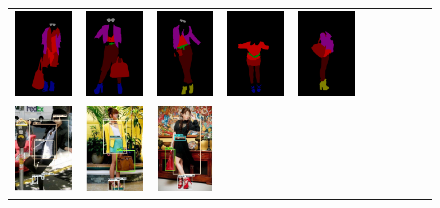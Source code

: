 \begin{figure}[H]
\begin{tabular}{cccccccccc}
		\includegraphics[width=.1\textwidth]{./figures/dataset/0020830.png} &
		\includegraphics[width=.1\textwidth]{./figures/dataset/0020879.png} &
		\includegraphics[width=.1\textwidth]{./figures/dataset/0020910.png} &
		\includegraphics[width=.1\textwidth]{./figures/dataset/0021450.png} &
		\includegraphics[width=.1\textwidth]{./figures/dataset/0022212.png}\\
		\includegraphics[width=.1\textwidth]{./figures/dataset/0023328_0_5_gt_b.jpg} & 
		\includegraphics[width=.1\textwidth]{./figures/dataset/0019351_0_5_gt_b.jpg} &
		\includegraphics[width=.1\textwidth]{./figures/dataset/0019891_0_5_gt_b.jpg} &

\end{tabular}
\end{figure}
